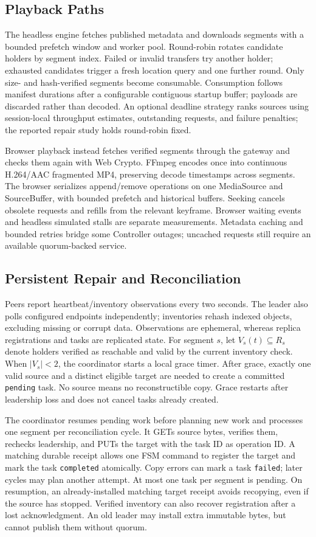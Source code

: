 \subsection{Playback Paths}
The headless engine fetches published metadata and downloads segments with a
bounded prefetch window and worker pool. Round-robin rotates candidate
holders by segment index. Failed or invalid transfers try another holder;
exhausted candidates trigger a fresh location query and one further round.
Only size- and hash-verified segments become consumable. Consumption follows
manifest durations after a configurable contiguous startup buffer; payloads
are discarded rather than decoded. An optional deadline strategy ranks
sources using session-local throughput estimates, outstanding requests, and
failure penalties; the reported repair study holds round-robin fixed.

Browser playback instead fetches verified segments through the gateway and
checks them again with Web Crypto. FFmpeg encodes once into continuous
H.264/AAC fragmented MP4, preserving decode timestamps across segments.
The browser serializes append/remove operations on one MediaSource and
SourceBuffer, with bounded prefetch and historical buffers. Seeking cancels
obsolete requests and refills from the relevant keyframe. Browser waiting
events and headless simulated stalls are separate measurements. Metadata
caching and bounded retries bridge some Controller outages; uncached requests
still require an available quorum-backed service.

\subsection{Persistent Repair and Reconciliation}
Peers report heartbeat/inventory observations every two seconds. The leader
also polls configured endpoints independently; inventories rehash indexed
objects, excluding missing or corrupt data. Observations are ephemeral,
whereas replica registrations and tasks are replicated state. For segment
$s$, let $V_s(t)\subseteq R_s$ denote holders verified as reachable and valid
by the current inventory check. When $|V_s|<2$, the coordinator starts a
local grace timer. After grace, exactly one valid source and a distinct
eligible target are needed to create a committed \texttt{pending} task.
No source means no reconstructible copy. Grace restarts after leadership
loss and does not cancel tasks already created.

The coordinator resumes pending work before planning new work and processes
one segment per reconciliation cycle. It GETs source bytes, verifies them,
rechecks leadership, and PUTs the target with the task ID as operation ID.
A matching durable receipt allows one FSM command to register the target
and mark the task \texttt{completed} atomically. Copy errors can mark a task
\texttt{failed}; later cycles may plan another attempt. At most one task per
segment is pending. On resumption, an already-installed matching target
receipt avoids recopying, even if the source has stopped. Verified inventory
can also recover registration after a lost acknowledgment. An old leader
may install extra immutable bytes, but cannot publish them without quorum.

